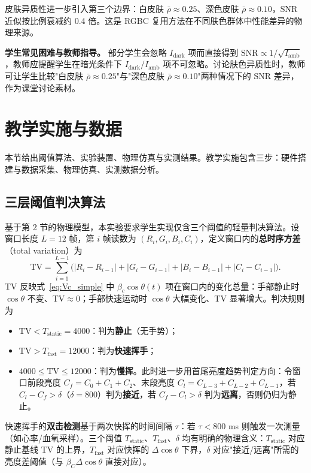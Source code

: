 \documentclass[11pt,a4paper]{ctexart}
\begin{document}
皮肤异质性进一步引入第三个边界：白皮肤 $\bar{\rho}\approx 0.25$、深色皮肤 $\bar{\rho}\approx 0.10$，SNR 近似按比例衰减约 0.4 倍。这是 RGBC 复用方法在不同肤色群体中性能差异的物理来源。

\textbf{学生常见困难与教师指导。} 部分学生会忽略 $I_{\mathrm{dark}}$ 项而直接得到 $\mathrm{SNR}\propto 1/\sqrt{I_{\mathrm{amb}}}$，教师应提醒学生在暗光条件下 $I_{\mathrm{dark}}/I_{\mathrm{amb}}$ 项不可忽略。讨论肤色异质性时，教师可让学生比较"白皮肤 $\bar{\rho}\approx 0.25$"与"深色皮肤 $\bar{\rho}\approx 0.10$"两种情况下的 SNR 差异，作为课堂讨论素材。

\section{教学实施与数据}
\label{sec:implementation}

本节给出阈值算法、实验装置、物理仿真与实测结果。教学实施包含三步：硬件搭建与数据采集、物理仿真、实测数据分析。

\subsection{三层阈值判决算法}
\label{sec:algo_threshold}

基于第 2 节的物理模型，本实验要求学生实现仅含三个阈值的轻量判决算法。设窗口长度 $L=12$ 帧，第 $i$ 帧读数为 $(R_i,G_i,B_i,C_i)$，定义窗口内的\textbf{总时序方差}（total variation）为
\begin{equation}
\mathrm{TV}=\sum_{i=1}^{L-1}\bigl(|R_i-R_{i-1}|+|G_i-G_{i-1}|+|B_i-B_{i-1}|+|C_i-C_{i-1}|\bigr).
\label{eq:tv}
\end{equation}
TV 反映式~\eqref{eq:Vc_simple} 中 $\beta_c\cos\theta(t)$ 项在窗口内的变化总量：手部静止时 $\cos\theta$ 不变、TV$\approx 0$；手部快速运动时 $\cos\theta$ 大幅变化、TV 显著增大。判决规则为
\begin{itemize}[leftmargin=1.5em]
  \item $\mathrm{TV}<T_{\mathrm{static}}=4000$：判为\textbf{静止}（无手势）；
  \item $\mathrm{TV}>T_{\mathrm{fast}}=12000$：判为\textbf{快速挥手}；
  \item $4000\le\mathrm{TV}\le 12000$：判为\textbf{慢挥}。此时进一步用首尾亮度趋势判定方向：令窗口前段亮度 $C_f=C_0+C_1+C_2$、末段亮度 $C_l=C_{L-3}+C_{L-2}+C_{L-1}$，若 $C_l-C_f>\delta$（$\delta=800$）判为\textbf{接近}，若 $C_f-C_l>\delta$ 判为\textbf{远离}，否则仍归为静止。
\end{itemize}
快速挥手的\textbf{双击检测}基于两次快挥的时间间隔 $\tau$：若 $\tau<800$ ms 则触发一次测量（如心率/血氧采样）。三个阈值 $T_{\mathrm{static}}$、$T_{\mathrm{fast}}$、$\delta$ 均有明确的物理含义：$T_{\mathrm{static}}$ 对应静止基线 TV 的上界，$T_{\mathrm{fast}}$ 对应快挥的 $\Delta\cos\theta$ 下界，$\delta$ 对应"接近/远离"所需的亮度差阈值（与 $\beta_C\Delta\cos\theta$ 直接对应）。
\end{document}
